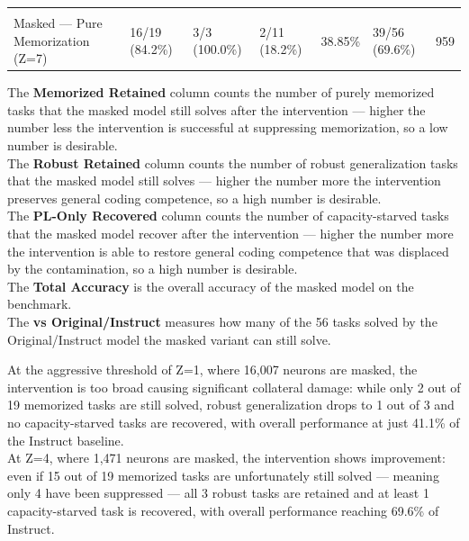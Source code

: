 \documentclass[mscthesis]{usiinfthesis}
\begin{document}
\begin{table}[H]
{\begin{tabular}{lllllll}
& & & & & & \\
\multirow{2}{10em}{Masked --- Pure Memorization (Z=7)} & \multirow{2}{7em}{16/19 (84.2\%)} & \multirow{2}{7em}{3/3 (100.0\%)} & \multirow{2}{7em}{2/11 (18.2\%)} &\multirow{2}{4em}{38.85\%} & \multirow{2}{7em}{39/56 (69.6\%)} & \multirow{2}{4em}{959} \\
& & & & & & \\
\hline
\end{tabular}%
}
\end{table}

The \textbf{Memorized Retained} column counts the number of purely memorized tasks that the masked model still solves after the intervention
--- higher the number less the intervention is successful at suppressing memorization, so a low number is desirable.\\
The \textbf{Robust Retained} column counts the number of robust generalization tasks that the masked model still solves
--- higher the number more the intervention preserves general coding competence, so a high number is desirable.\\
The \textbf{PL-Only Recovered} column counts the number of capacity-starved tasks that the masked model recover after the intervention
--- higher the number more the intervention is able to restore general coding competence that was displaced by the contamination, so a high number is desirable.\\
The \textbf{Total Accuracy} is the overall accuracy of the masked model on the benchmark.\\
The \textbf{vs Original/Instruct} measures how many of the 56 tasks solved by the Original/Instruct model the masked variant can still solve.
\par\vspace{1em}
At the aggressive threshold of Z=1, where 16,007 neurons are masked, the intervention is too broad causing significant collateral damage: 
while only 2 out of 19 memorized tasks are still solved, robust generalization drops to 1
out of 3 and no capacity-starved tasks are recovered, with overall performance at just
41.1\% of the Instruct baseline. \\
At Z=4, where 1,471 neurons are masked, the intervention shows improvement: even if 15 out of
19 memorized tasks are unfortunately still solved --- meaning only 4 have been
suppressed --- all 3 robust tasks are retained and at least 1 capacity-starved task is recovered,
with overall performance reaching 69.6\% of Instruct. \\
\end{document}

